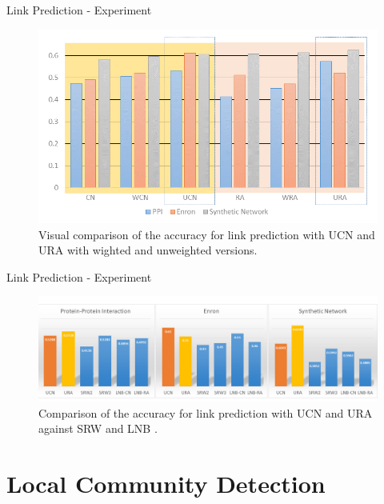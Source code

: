 \documentclass[9pt]{beamer}
\begin{document}
\begin{frame}{Link Prediction - Experiment}

\begin{figure}
\centering
\includegraphics[scale = 0.9]{Result-Fig1.png}
\caption{Visual comparison of the accuracy for link prediction with UCN and URA with wighted and unweighted versions.}
\label{example}
\end{figure}

\end{frame}




\begin{frame}{Link Prediction - Experiment}

\begin{figure}
\centering
\includegraphics[scale = 0.6]{Results-Fig2.png}
\caption{Comparison of the accuracy for link prediction with UCN and URA against SRW \cite{liu2010link} and LNB \cite{liu2011link}.}
\label{example}
\end{figure}

\end{frame}

\section{Local Community Detection}
\end{document}
